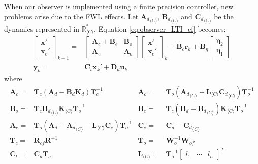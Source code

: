 \documentclass[sigconf]{llncs}
\newcommand{\mat}[1]{\boldsymbol{#1}}
\renewcommand{\vec}[1]{\boldsymbol{#1}}
\begin{document}
When our observer is implemented using a finite precision controller, new
problems arise due to the FWL effects.  Let ${\mat{A}_d}_{\langle C
\rangle}$, ${\mat{B}_d}_{\langle C \rangle}$ and ${\mat{C}_d}_{\langle C
\rangle}$ be the dynamics represented in $\mathbb{R}_{\langle C\rangle}^*$,
%
Equation \eqref{eq:observer_LTI_cf} becomes:
%
\begin{align}
\left [\begin{array}{c}\vec{x}'\\ \vec{x}_e' \end{array}\right]_{k+1}
=& \left [\begin{array}{cc}\mat{A}_{c}+\mat{B}_{e}&\mat{B}_{o}\\ \mat{A}_{e}&\mat{A}_{o}\end{array}\right]
\left [\begin{array}{c}\vec{x}'\\ \vec{x}_e' \end{array}\right]_k
+\mat{B}_{c} \vec{r}_k
+\mat{B}_{\eta}\left [\begin{array}{c}\vec{\eta}_2\\ \vec{\eta}_1\end{array}\right]\nonumber\\
\vec{y}_k=&\mat{C}_{t}\vec{x}_k' + \mat{D}_{d}\vec{u}_k
\label{eq:observer_LTI_FWL_cf}
\end{align}
where
{\setlength{\abovedisplayskip}{2pt}
\setlength{\belowdisplayskip}{2pt}
\begin{align*}
\mat{A}_{c}=&\mat{T}_c\left(\mat{A}_d-\mat{B}_d\mat{K}_d\right)\mat{T}_c^{-1}&
\mat{A}_{o}=&\mat{T}_o\left({\mat{A}_d}_{\langle C \rangle}-\mat{L}_{\langle C \rangle}{\mat{C}_d}_{\langle C \rangle}\right)\mat{T}_o^{-1}\\
\mat{B}_{o}=&\mat{T}_c{\mat{B}_d}_{\langle C \rangle}\mat{K}_{\langle C \rangle}\mat{T}_o^{-1}&
\mat{B}_{e}=&\mat{T}_c(\mat{B}_d-{\mat{B}_d}_{\langle C \rangle})\mat{K}_{\langle C \rangle}\mat{T}_o^{-1}\\
\mat{A}_{e}=&\mat{T}_o\left(\mat{A}_d-{\mat{A}_d}_{\langle C \rangle}-\mat{L}_{\langle C \rangle}\mat{C}_e\right)\mat{T}_o^{-1}&
\mat{C}_{e}=&\mat{C}_d-{\mat{C}_d}_{\langle C \rangle}\\
\mat{T}_c=&\mat{R}_{cf}\mat{R}^{-1}&
\mat{T}_o=&\mat{W}_o^{-1}\mat{W}_{of}\\
\mat{C}_t=&\mat{C}_d\mat{T}_c&
\mat{L}_{\langle C \rangle}=& \mat{T}_o^{-1}\left[ \begin{array}{ccc}l_1&\cdots&l_n\end{array}\right]^T
\end{align*}
}
\end{document}
